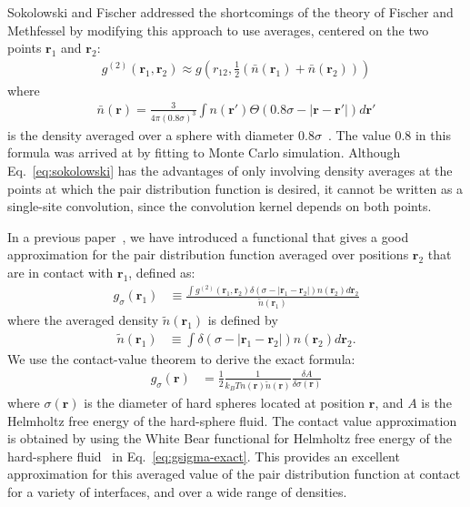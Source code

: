 \documentclass[letterpaper,twocolumn,amsmath,amssymb,pre,aps,10pt]{revtex4-1}
\newcommand{\rr}{\textbf{r}}
\begin{document}
Sokolowski and Fischer addressed the shortcomings of the theory of
Fischer and Methfessel by modifying this approach to use
averages, centered on the two points $\rr_1$ and $\rr_2$:
\begin{align}
  g^{(2)}(\rr_1,\rr_2) \approx g\left(r_{12},
  \tfrac12(\bar{n}(\rr_1)+\bar{n}(\rr_2))\right)
  \label{eq:sokolowski}
\end{align}
where
\begin{align}
  \bar{n}(\rr) = \frac{3}{4\pi (0.8\sigma)^3}\int n(\rr')\Theta(0.8\sigma - |\rr-\rr'|) d\rr'
\end{align}
is the density averaged over a sphere with diameter
$0.8\sigma$~\cite{sokolowski1992role}.  The value 0.8 in this formula
was arrived at by fitting to Monte Carlo simulation.  Although
Eq.~\ref{eq:sokolowski} has the advantages of only involving density
averages at the points at which the pair distribution function is
desired, it cannot be written as a single-site convolution, since the
convolution kernel depends on both points.

In a previous paper~\cite{schulte2012using}, we have introduced a
functional that gives a good approximation for the pair distribution
function averaged over positions $\rr_2$ that are in contact with
$\rr_1$, defined as:
\begin{align}
  g_\sigma(\rr_1) &\equiv \frac{ \int g^{(2)}(\rr_1,\rr_2) \delta(\sigma -|\rr_1-\rr_2|)n(\rr_2)
    d\rr_2 }{ \tilde{n}(\rr_1)  }
\end{align}
where the averaged density $\tilde{n}(\rr_1)$ is defined by
\begin{align}
  \tilde{n}(\rr_1) &\equiv \int \delta(\sigma -|\rr_1 - \rr_2|)n(\rr_2) d\rr_2.
\end{align}
We use the contact-value theorem to derive the exact formula:
\begin{align}
  g_\sigma(\rr)%
  &= \frac12 \frac{1}{k_BT n(\rr) \tilde{n}(\rr)} \frac{\delta
    A}{\delta \sigma(\mathbf{r})} \label{eq:gsigma-exact}
\end{align}
where $\sigma(\rr)$ is the diameter of hard spheres located at
position $\rr$, and $A$ is the Helmholtz free energy of the
hard-sphere fluid.  The contact value approximation is obtained by
using the White Bear functional for Helmholtz free energy of the
hard-sphere fluid~\cite{roth2002whitebear} in
Eq.~\ref{eq:gsigma-exact}.  This provides an excellent approximation
for this averaged value of the pair distribution function at contact
for a variety of interfaces, and over a wide range of densities.
\end{document}
